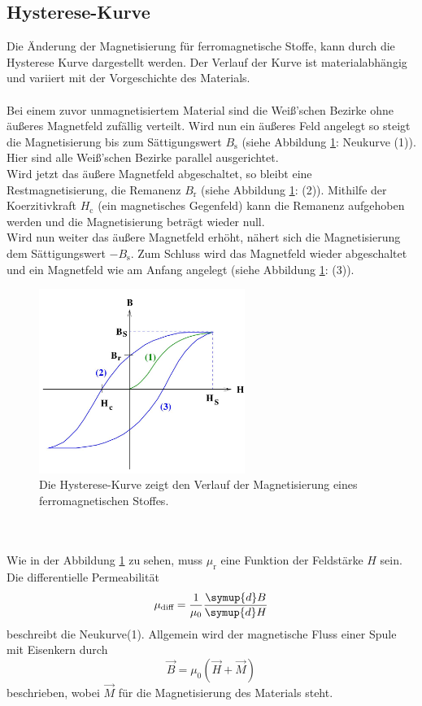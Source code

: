\subsection{Hysterese-Kurve}
Die Änderung der Magnetisierung für ferromagnetische Stoffe, kann durch die Hysterese Kurve dargestellt werden. Der Verlauf der Kurve ist materialabhängig und
variiert mit der Vorgeschichte des Materials.\\ \\
Bei einem zuvor unmagnetisiertem Material sind die Weiß'schen Bezirke ohne äußeres Magnetfeld zufällig verteilt. Wird nun ein äußeres Feld angelegt so
steigt die Magnetisierung bis zum Sättigungswert $B_\text{s}$ (siehe Abbildung \ref{fig:hysterese}: Neukurve (1)). Hier sind alle Weiß'schen Bezirke parallel ausgerichtet.\\
Wird jetzt das äußere Magnetfeld abgeschaltet, so bleibt eine Restmagnetisierung, die Remanenz $B_\text{r}$ (siehe Abbildung \ref{fig:hysterese}: (2)).
Mithilfe der Koerzitivkraft $H_\text{c}$ (ein magnetisches Gegenfeld) kann die Remanenz aufgehoben werden und die Magnetisierung beträgt wieder null.\\
Wird nun weiter das äußere Magnetfeld erhöht, nähert sich die Magnetisierung dem Sättigungswert $-B_\text{s}$. Zum Schluss wird das Magnetfeld wieder abgeschaltet und ein Magnetfeld
wie am Anfang angelegt (siehe Abbildung \ref{fig:hysterese}: (3)).
\begin{figure}
    \centering
    \includegraphics[height=6cm]{content/hysterese.jpg}
    \caption{Die Hysterese-Kurve zeigt den Verlauf der Magnetisierung eines ferromagnetischen Stoffes. \cite[3]{anleitung}}
    \label{fig:hysterese}
\end{figure}
\\
\\
Wie in der Abbildung \ref{fig:hysterese} zu sehen, muss $\mu_\text{r}$ eine Funktion der Feldstärke $H$ sein.
Die differentielle Permeabilität
\begin{equation}
    \mu_\text{diff} = \frac{1}{\mu_0} \frac{\symup{d}B}{\symup{d}H}
\end{equation}
beschreibt die Neukurve(1). Allgemein wird der magnetische Fluss einer Spule mit Eisenkern durch
\begin{equation}
    \vec{B} = \mu_0 \left( \vec{H} + \vec{M} \right)
\end{equation}
beschrieben, wobei $\vec{M}$ für die Magnetisierung des Materials steht.